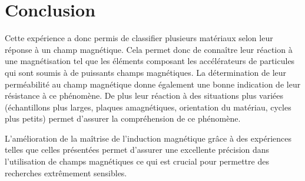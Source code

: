 \section{Conclusion}

Cette expérience a donc permis de classifier plusieurs matériaux selon leur réponse à un champ magnétique. Cela permet donc de connaître leur réaction à une magnétisation tel que les éléments composant les accélérateurs de particules qui sont soumis à de puissants champs magnétiques. La détermination de leur perméabilité au champ magnétique donne également une bonne indication de leur résistance à ce phénomène. De plus leur réaction à des situations plus variées (échantillons plus larges, plaques amagnétiques, orientation du matériau, cycles plus petits) permet d'assurer la compréhension de ce phénomène.

L'amélioration de la maîtrise de l'induction magnétique grâce à des expériences telles que celles présentées permet d'assurer une excellente précision dans l'utilisation de champs magnétiques ce qui est crucial pour permettre des recherches extrêmement sensibles.